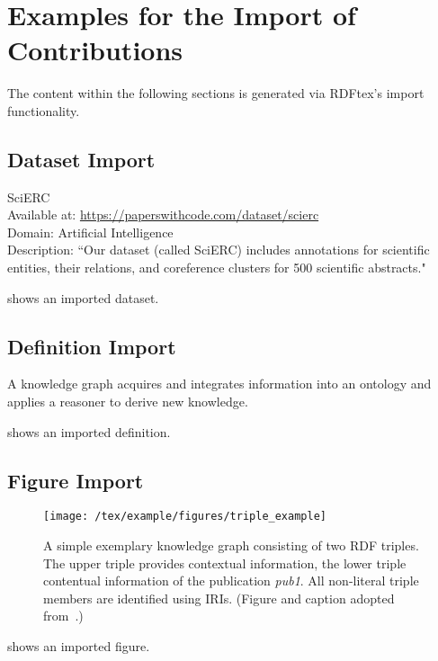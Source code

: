 
\section{Examples for the Import of Contributions}

The content within the following sections is generated via RDFtex's import functionality.

\subsection{Dataset Import}

\begin{dataset}
SciERC~\cite{DBLP:conf/emnlp/LuanHOH18}\\
Available at: \url{https://paperswithcode.com/dataset/scierc}\\
Domain: Artificial Intelligence\\
Description: ``Our dataset (called SciERC) includes annotations for scientific entities, their relations, and coreference clusters for 500 scientific abstracts."~\cite{DBLP:conf/emnlp/LuanHOH18}
\label{dataset:scierc}
\end{dataset}
 shows an imported dataset.

\subsection{Definition Import}

\begin{definition}
\label{def:knowledge-graph}
A knowledge graph acquires and integrates information into an ontology and applies a reasoner to derive new knowledge.
\end{definition}
 shows an imported definition.

\subsection{Figure Import}

\begin{figure}[htb!]
\centering
\texttt{[image: /tex/example/figures/triple\_example]}
\caption{A simple exemplary knowledge graph consisting of two RDF triples. The upper triple provides contextual information, the lower triple contentual information of the publication \emph{{pub1}}. All non-literal triple members are identified using IRIs. (Figure and caption adopted from~\cite{Martin21}.)}
\label{fig:contentual-contextual}
\end{figure}
 shows an imported figure.

